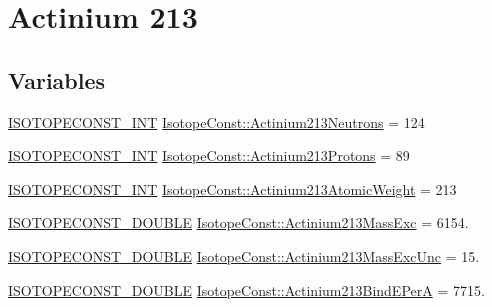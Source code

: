 \hypertarget{group___isotope_const-_actinium-_ac213}{}\section{Actinium 213}
\label{group___isotope_const-_actinium-_ac213}
\subsection*{Variables}
\begin{DoxyCompactItemize}
\item 
\mbox{\hyperlink{group___isotope_const-_macros_ga5f18360b3e99483a35c32d789e62621c}{I\+S\+O\+T\+O\+P\+E\+C\+O\+N\+S\+T\+\_\+\+I\+NT}} \mbox{\hyperlink{group___isotope_const-_actinium-_ac213_ga02fd942420e11bebef82544b565cc0cf}{Isotope\+Const\+::\+Actinium213\+Neutrons}} = 124
\item 
\mbox{\hyperlink{group___isotope_const-_macros_ga5f18360b3e99483a35c32d789e62621c}{I\+S\+O\+T\+O\+P\+E\+C\+O\+N\+S\+T\+\_\+\+I\+NT}} \mbox{\hyperlink{group___isotope_const-_actinium-_ac213_ga9140c5259e47d7389c58b376b91d40ad}{Isotope\+Const\+::\+Actinium213\+Protons}} = 89
\item 
\mbox{\hyperlink{group___isotope_const-_macros_ga5f18360b3e99483a35c32d789e62621c}{I\+S\+O\+T\+O\+P\+E\+C\+O\+N\+S\+T\+\_\+\+I\+NT}} \mbox{\hyperlink{group___isotope_const-_actinium-_ac213_ga34454a1e62c926379cbd33451686a552}{Isotope\+Const\+::\+Actinium213\+Atomic\+Weight}} = 213
\item 
\mbox{\hyperlink{group___isotope_const-_macros_ga8f45a7272ce02c0b4c65c44636ed719a}{I\+S\+O\+T\+O\+P\+E\+C\+O\+N\+S\+T\+\_\+\+D\+O\+U\+B\+LE}} \mbox{\hyperlink{group___isotope_const-_actinium-_ac213_gaab4d299e61d0c5b67d7e9254ac35aee6}{Isotope\+Const\+::\+Actinium213\+Mass\+Exc}} = 6154.
\item 
\mbox{\hyperlink{group___isotope_const-_macros_ga8f45a7272ce02c0b4c65c44636ed719a}{I\+S\+O\+T\+O\+P\+E\+C\+O\+N\+S\+T\+\_\+\+D\+O\+U\+B\+LE}} \mbox{\hyperlink{group___isotope_const-_actinium-_ac213_ga2824b19acf73c2d40b585d7ca3c032bf}{Isotope\+Const\+::\+Actinium213\+Mass\+Exc\+Unc}} = 15.
\item 
\mbox{\hyperlink{group___isotope_const-_macros_ga8f45a7272ce02c0b4c65c44636ed719a}{I\+S\+O\+T\+O\+P\+E\+C\+O\+N\+S\+T\+\_\+\+D\+O\+U\+B\+LE}} \mbox{\hyperlink{group___isotope_const-_actinium-_ac213_ga0facaa79e35fb15608f119917336676d}{Isotope\+Const\+::\+Actinium213\+Bind\+E\+PerA}} = 7715.
\item 

\end{DoxyCompactItemize}
